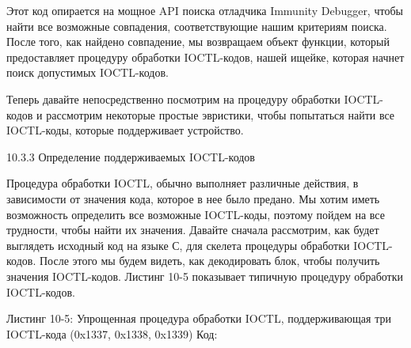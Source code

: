 \documentclass[12pt, a4paper, oneside]{book}
\begin{document}


Этот код опирается на мощное API поиска отладчика Immunity Debugger, чтобы найти все возможные совпадения, соответствующие нашим критериям поиска. После того, как найдено совпадение, мы возвращаем объект функции, который предоставляет процедуру обработки IOCTL-кодов, нашей ищейке, которая начнет поиск допустимых IOCTL-кодов.

Теперь давайте непосредственно посмотрим на процедуру обработки IOCTL-кодов и рассмотрим некоторые простые эвристики, чтобы попытаться найти все IOCTL-коды, которые поддерживает устройство. 

10.3.3 Определение поддерживаемых IOCTL-кодов

Процедура обработки IOCTL, обычно выполняет различные действия, в зависимости от значения кода, которое в нее было предано. Мы хотим иметь возможность определить все возможные IOCTL-коды, поэтому пойдем на все трудности, чтобы найти их значения. Давайте сначала рассмотрим, как будет выглядеть исходный код на языке С, для скелета процедуры обработки IOCTL-кодов. После этого мы будем видеть, как декодировать блок, чтобы получить значения IOCTL-кодов. Листинг 10-5 показывает типичную процедуру обработки IOCTL-кодов.

Листинг 10-5: Упрощенная процедура обработки IOCTL, поддерживающая три IOCTL-кода (0x1337, 0x1338, 0x1339)
Код:



\end{document}

